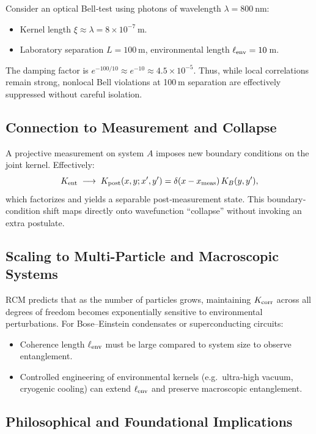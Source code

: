 Consider an optical Bell‐test using photons of wavelength \(\lambda=800\) nm:
\begin{itemize}
  \item Kernel length \(\xi\approx \lambda = 8\times10^{-7}\) m.
  \item Laboratory separation \(L=100\) m, environmental length \(\ell_{\rm env}=10\) m.
\end{itemize}
The damping factor is \(e^{-100/10}\approx e^{-10}\approx4.5\times10^{-5}\).  Thus, while local correlations remain strong, nonlocal Bell violations at 100 m separation are effectively suppressed without careful isolation.

\subsection{Connection to Measurement and Collapse}

A projective measurement on system \(A\) imposes new boundary conditions on the joint kernel.  Effectively:
\[
K_{\rm ent}\;\longrightarrow\;
K_{\rm post}(x,y; x',y')
= \delta(x - x_{\rm meas})\,K_B(y,y'),
\]
which factorizes and yields a separable post‐measurement state.  This boundary‐condition shift maps directly onto wavefunction “collapse” without invoking an extra postulate.

\subsection{Scaling to Multi-Particle and Macroscopic Systems}

RCM predicts that as the number of particles grows, maintaining \(K_{\rm corr}\) across all degrees of freedom becomes exponentially sensitive to environmental perturbations.  For Bose–Einstein condensates or superconducting circuits:
\begin{itemize}
  \item Coherence length \(\ell_{\rm env}\) must be large compared to system size to observe entanglement.
  \item Controlled engineering of environmental kernels (e.g.\ ultra‐high vacuum, cryogenic cooling) can extend \(\ell_{\rm env}\) and preserve macroscopic entanglement.
\end{itemize}

\subsection{Philosophical and Foundational Implications}

